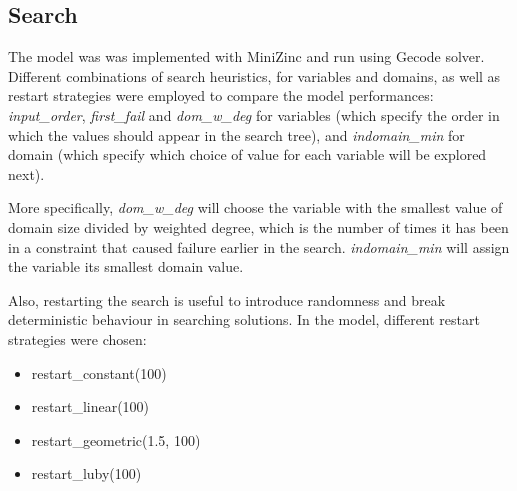 \subsection{Search}

The model was was implemented with MiniZinc and run using Gecode solver. Different combinations of search heuristics, for variables and domains, as well as restart strategies were employed to compare the model performances: \textit{input\_order}, \textit{first\_fail} and \textit{dom\_w\_deg} for variables (which specify the order in which the values should appear in the search tree), and \textit{indomain\_min} for domain (which specify which choice of value for each variable will be explored next).

More specifically, \textit{dom\_w\_deg} will choose the variable with the smallest value of domain size divided by weighted degree, which is the number of times it has been in a constraint that caused failure earlier in the search. \textit{indomain\_min} will assign the variable its smallest domain value.

Also, restarting the search is useful to introduce randomness and break deterministic behaviour in searching solutions. In the model, different restart strategies were chosen:
\begin{itemize}
    \item restart\_constant(100)
    \item restart\_linear(100)
    \item restart\_geometric(1.5, 100)
    \item restart\_luby(100)
\end{itemize}

